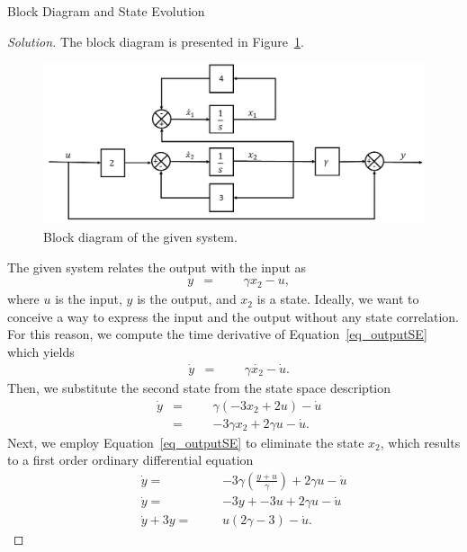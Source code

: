 \documentclass[12pt]{article}
\newenvironment{problem}[2][Problem]{\begin{trivlist}
\item[\hskip \labelsep {\bfseries #1}\hskip \labelsep {\bfseries #2.}]}{\end{trivlist}}
\newenvironment{solution}{\begin{proof}[Solution]}{\end{proof}}
\begin{document}
\begin{problem}{1.3} %
Block Diagram and State Evolution
\end{problem}
\begin{solution}
The block diagram is presented in Figure~\ref{fig_blockDiagram}.
\begin{figure}[!h]
	\includegraphics[width=.8\columnwidth]{figures/1_3_blockDiagram.png}
	\centering
	\caption{Block diagram of the given system.}
	\label{fig_blockDiagram}
\end{figure}
The given system relates the output with the input as
\begin{equation}\label{eq_outputSE}
\begin{aligned}
& y
& =
&&& \gamma x_2 -u,
\end{aligned}
\end{equation}
where $u$ is the input, $y$ is the output, and $x_2$ is a state. Ideally, we want to conceive a way to express the input and the output without any state correlation. For this reason, we compute the time derivative of Equation~\ref{eq_outputSE} which yields
\begin{equation}\label{eq_derOutpout}
\begin{aligned}
& \dot{y}
& =
&&& \gamma \dot{x_2} -\dot{u}.
\end{aligned}
\end{equation}
Then, we substitute the second state from the state space description
\begin{equation}\label{eq_derOutpout2}
\begin{aligned}
& \dot{y}
& =
&&& \gamma (-3x_2 +2u) -\dot{u}\\
&& =
&&& -3 \gamma x_2 +2\gamma u - \dot{u}.
\end{aligned}
\end{equation}
Next, we employ Equation~\ref{eq_outputSE} to eliminate the state $x_2$, which results to a first order ordinary differential equation
\begin{equation}\label{eq_derOutpout_final}
\begin{aligned}
&& \dot{y}
 =
&&& -3 \gamma (\frac{y+u}{\gamma}) +2\gamma u - \dot{u}\\
&& \dot{y}
 =
&&& -3 y+ -3u + 2\gamma u - \dot{u}\\
&& \dot{y}+3y
 =
&&& u(2\gamma-3) - \dot{u}.
\end{aligned}
\end{equation}

\end{solution}
\end{document}

